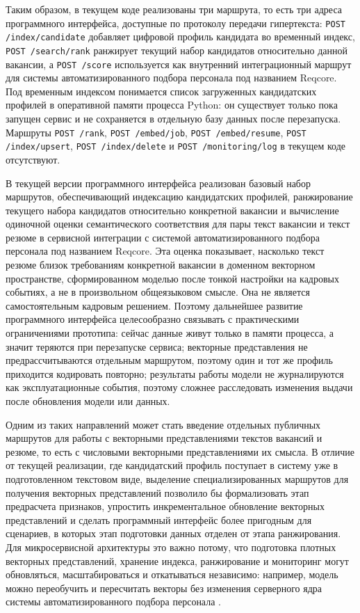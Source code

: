 Таким образом, в текущем коде реализованы три маршрута, то есть три адреса программного интерфейса, доступные по протоколу передачи гипертекста: \texttt{POST {\slash}index{\slash}candidate} добавляет цифровой профиль кандидата во временный индекс, \texttt{POST {\slash}search{\slash}rank} ранжирует текущий набор кандидатов относительно данной вакансии, а \texttt{POST {\slash}score} используется как внутренний интеграционный маршрут для системы автоматизированного подбора персонала под названием Reqcore. Под временным индексом понимается список загруженных кандидатских профилей в оперативной памяти процесса Python: он существует только пока запущен сервис и не сохраняется в отдельную базу данных после перезапуска. Маршруты \texttt{POST {\slash}rank}, \texttt{POST {\slash}embed{\slash}job}, \texttt{POST {\slash}embed{\slash}resume}, \texttt{POST {\slash}index{\slash}upsert}, \texttt{POST {\slash}index{\slash}delete} и \texttt{POST {\slash}monitoring{\slash}log} в текущем коде отсутствуют.

В текущей версии программного интерфейса реализован базовый набор маршрутов, обеспечивающий индексацию кандидатских профилей, ранжирование текущего набора кандидатов относительно конкретной вакансии и вычисление одиночной оценки семантического соответствия для пары текст вакансии и текст резюме в сервисной интеграции с системой автоматизированного подбора персонала под названием Reqcore. Эта оценка показывает, насколько текст резюме близок требованиям конкретной вакансии в доменном векторном пространстве, сформированном моделью после тонкой настройки на кадровых событиях, а не в произвольном общеязыковом смысле. Она не является самостоятельным кадровым решением. Поэтому дальнейшее развитие программного интерфейса целесообразно связывать с практическими ограничениями прототипа: сейчас данные живут только в памяти процесса, а значит теряются при перезапуске сервиса; векторные представления не предрассчитываются отдельным маршрутом, поэтому один и тот же профиль приходится кодировать повторно; результаты работы модели не журналируются как эксплуатационные события, поэтому сложнее расследовать изменения выдачи после обновления модели или данных.

Одним из таких направлений может стать введение отдельных публичных маршрутов для работы с векторными представлениями текстов вакансий и резюме, то есть с числовыми векторными представлениями их смысла. В отличие от текущей реализации, где кандидатский профиль поступает в систему уже в подготовленном текстовом виде, выделение специализированных маршрутов для получения векторных представлений позволило бы формализовать этап предрасчета признаков, упростить инкрементальное обновление векторных представлений и сделать программный интерфейс более пригодным для сценариев, в которых этап подготовки данных отделен от этапа ранжирования. Для микросервисной архитектуры это важно потому, что подготовка плотных векторных представлений, хранение индекса, ранжирование и мониторинг могут обновляться, масштабироваться и откатываться независимо: например, модель можно переобучить и пересчитать векторы без изменения серверного ядра системы автоматизированного подбора персонала \cite{src32, src33}.

